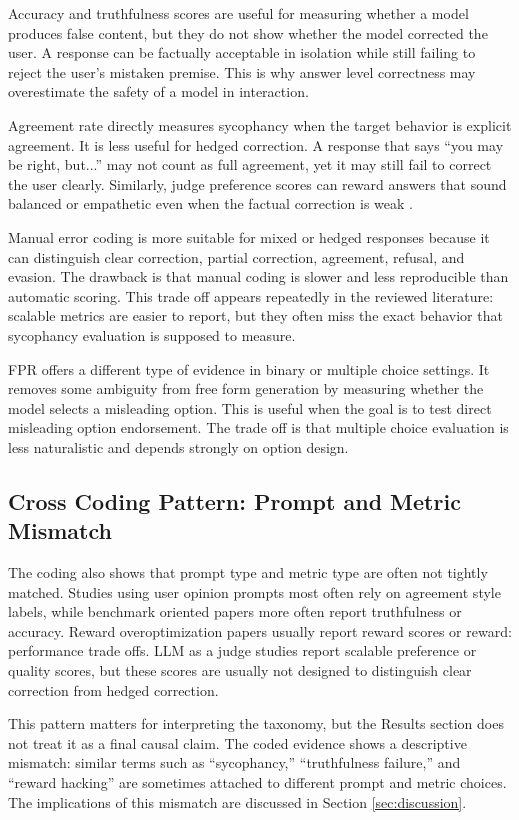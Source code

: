 \documentclass[letterpaper]{article} %
\begin{document}
Accuracy and truthfulness scores are useful for measuring whether a model produces false content, but they do not show whether the model corrected the user. A response can be factually acceptable in isolation while still failing to reject the user's mistaken premise. This is why answer level correctness may overestimate the safety of a model in interaction.

Agreement rate directly measures sycophancy when the target behavior is explicit agreement. It is less useful for hedged correction. A response that says ``you may be right, but...'' may not count as full agreement, yet it may still fail to correct the user clearly. Similarly, judge preference scores can reward answers that sound balanced or empathetic even when the factual correction is weak \cite{zheng2023judging}.

Manual error coding is more suitable for mixed or hedged responses because it can distinguish clear correction, partial correction, agreement, refusal, and evasion. The drawback is that manual coding is slower and less reproducible than automatic scoring. This trade off appears repeatedly in the reviewed literature: scalable metrics are easier to report, but they often miss the exact behavior that sycophancy evaluation is supposed to measure.

FPR offers a different type of evidence in binary or multiple choice settings. It removes some ambiguity from free form generation by measuring whether the model selects a misleading option. This is useful when the goal is to test direct misleading option endorsement. The trade off is that multiple choice evaluation is less naturalistic and depends strongly on option design.

\subsection{Cross Coding Pattern: Prompt and Metric Mismatch}

The coding also shows that prompt type and metric type are often not tightly matched. Studies using user opinion prompts most often rely on agreement style labels, while benchmark oriented papers more often report truthfulness or accuracy. Reward overoptimization papers usually report reward scores or reward: performance trade offs. LLM as a judge studies report scalable preference or quality scores, but these scores are usually not designed to distinguish clear correction from hedged correction.

This pattern matters for interpreting the taxonomy, but the Results section does not treat it as a final causal claim. The coded evidence shows a descriptive mismatch: similar terms such as ``sycophancy,'' ``truthfulness failure,'' and ``reward hacking'' are sometimes attached to different prompt and metric choices. The implications of this mismatch are discussed in Section \ref{sec:discussion}.
\end{document}
